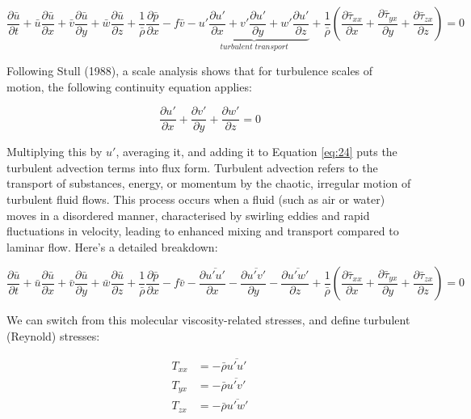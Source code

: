 \documentclass{article}
\begin{document}
\begin{equation}
\frac{\partial \bar{u}}{\partial t} + \bar{u}\frac{\partial \bar{u}}{\partial x} + \bar{v}\frac{\partial \bar{u}}{\partial y} + \bar{w}\frac{\partial \bar{u}}{\partial z} + \frac{1}{\bar{\rho}}\frac{\partial \bar{p}}{\partial x} - f\bar{v} - \underbrace{u'\frac{\partial u'}{\partial x} + v'\frac{\partial u'}{\partial y} + w'\frac{\partial u'}{\partial z}}_{turbulent\;transport} + \frac{1}{\bar{\rho}}\left(\frac{\partial \bar{\tau}_{xx}}{\partial x} + \frac{\partial \bar{\tau}_{yx}}{\partial y} + \frac{\partial \bar{\tau}_{zx}}{\partial z}\right) = 0
\label{eq:24}
\end{equation}

Following Stull (1988), a scale analysis shows that for turbulence scales of motion, the following continuity equation applies:

\begin{equation}
\frac{\partial u'}{\partial x} + \frac{\partial v'}{\partial y} + \frac{\partial w'}{\partial z} = 0
\label{eq:25}
\end{equation}

Multiplying this by $u'$, averaging it, and adding it to Equation \ref{eq:24} puts the turbulent advection terms into flux form.  Turbulent advection refers to the transport of substances, energy, or momentum by the chaotic, irregular motion of turbulent fluid flows. This process occurs when a fluid (such as air or water) moves in a disordered manner, characterised by swirling eddies and rapid fluctuations in velocity, leading to enhanced mixing and transport compared to laminar flow. Here’s a detailed breakdown:

\begin{equation}
\frac{\partial \bar{u}}{\partial t} + \bar{u}\frac{\partial \bar{u}}{\partial x} + \bar{v}\frac{\partial \bar{u}}{\partial y} + \bar{w}\frac{\partial \bar{u}}{\partial z} + \frac{1}{\bar{\rho}}\frac{\partial \bar{p}}{\partial x} - f\bar{v} - \frac{\partial \overline{u'u'}}{\partial x} - \frac{\partial \overline{u'v'}}{\partial y} - \frac{\partial \overline{u'w'}}{\partial z} + \frac{1}{\bar{\rho}}\left(\frac{\partial \bar{\tau}_{xx}}{\partial x} + \frac{\partial \bar{\tau}_{yx}}{\partial y} + \frac{\partial \bar{\tau}_{zx}}{\partial z}\right) = 0
\label{eq:26}
\end{equation}

We can switch from this molecular viscosity-related stresses, and define turbulent (Reynold) stresses:

\begin{align}
T_{xx} &= -\bar{\rho}\overline{u'u'} \label{eq:27} \\
T_{yx} &= -\bar{\rho}\overline{u'v'} \label{eq:28} \\
T_{zx} &= -\bar{\rho}\overline{u'w'} \label{eq:29}
\end{align}
\end{document}
